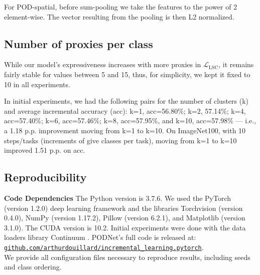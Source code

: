 \documentclass[runningheads]{llncs}
\newcommand{\mcL}{\mathcal{L}}
\begin{document}
For POD-spatial, before sum-pooling we take the features to the power of 2 element-wise. The vector resulting from the pooling is then L2 normalized. 

\subsection{Number of proxies per class}

While our model's expressiveness increases with more proxies in $\mcL_\text{LSC}$, it remains fairly  stable for values between 5 and 15, thus, for simplicity, we kept it fixed to 10 in all experiments.

In initial experiments, we had the following pairs for the number of clusters (k) and average incremental accuracy (acc): k=1, acc=56.80\%; k=2, 57.14\%; k=4, acc=57.40\%; k=6, acc=57.46\%; k=8, acc=57.95\%, and k=10, acc=57.98\% --- i.e., a 1.18 p.p. improvement moving from k=1 to k=10. On ImageNet100, with 10 steps/tasks (increments of give classes per task), moving from k=1 to k=10 improved 1.51 p.p. on acc.

\subsection{Reproducibility}

\textbf{Code Dependencies} The Python version is  3.7.6. We used the PyTorch \cite{paszke2017pytorch} (version 1.2.0) deep learning framework and the libraries Torchvision (version 0.4.0), NumPy \cite{oliphant2006numpy} (version 1.17.2), Pillow (version 6.2.1), and Matplotlib \cite{hunter2007matplotlib} (version 3.1.0). The CUDA version is 10.2. Initial experiments were done with the data loaders library Continuum \cite{douillardlesort2020continuum}. PODNet's full code is released at:\\ \href{https://github.com/arthurdouillard/incremental\_learning.pytorch}{\texttt{github.com/arthurdouillard/incremental\_learning.pytorch}}. \\We provide all configuration files necessary to reproduce results, including seeds and class ordering. 




\end{document}
